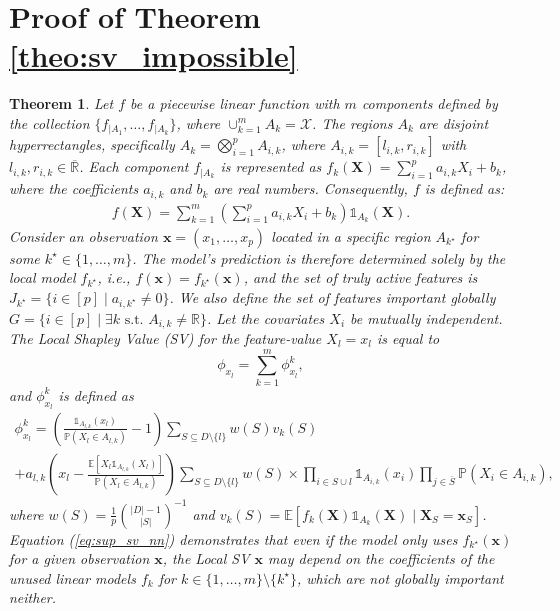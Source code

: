 \documentclass{article}
\newcommand\XS{\boldsymbol{X}_S}
\newcommand\X{\boldsymbol{X}}
\newcommand\xs{\boldsymbol{x}_S}
\newcommand\x{\boldsymbol{x}}
\theoremstyle{plain}
\newtheorem{theorem}{Theorem}[section]
\theoremstyle{definition}
\theoremstyle{remark}
\begin{document}
\section{Proof of Theorem \ref{theo:sv_impossible}} \label{sup:proof_shapdecomposition}
\begin{theorem}
    Let $f$ be a piecewise linear function with $m$ components defined by the collection $\{f_{\lvert A_1}, \dots, f_{\lvert A_k}\}$, where $\cup_{k=1}^m A_k = \mathcal{X}$. The regions $A_k$ are disjoint hyperrectangles, specifically $A_k = \bigotimes_{i = 1}^{p} A_{i,k}$, where $A_{i, k} = [l_{i, k}, r_{i, k}]$ with $l_{i, k}, r_{i, k} \in \overline{\mathbb{R}}$. Each component $f_{\lvert A_k}$ is represented as $f_k(\X) = \sum_{i=1}^p a_{i, k} X_i + b_k$, where the coefficients $a_{i,k}$ and $b_k$ are real numbers. Consequently, $f$ is defined as:
    \begin{align*}
        f(\X) =  \sum_{k=1}^m \left(\sum_{i=1}^p a_{i, k} X_i + b_k \right)\mathds{1}_{A_k}(\X).
    \end{align*}
    Consider an observation $\mathbf{x} = (x_1, \dots, x_p)$ located in a specific region $A_{k^\star}$ for some $k^\star \in \{1, \dots, m\}$. The model's prediction is therefore determined solely by the local model $f_{k^\star}$, i.e., $f(\mathbf{x}) = f_{k^\star}(\mathbf{x})$, and the set of truly active features is $J_{k^\star} = \{i \in [p] \mid a_{i,k^\star} \neq 0\}$. We also define the set of features important globally $G = \{i \in [p] \mid \exists k \text{ s.t. } A_{i,k} \neq \mathbb{R}\}$. Let the covariates $X_i$ be mutually independent. The Local Shapley Value (SV) for the feature-value $X_l=x_l$ is equal to
    \begin{equation*}
        \phi_{x_l} = \sum_{k=1}^m \phi_{x_l}^k,
    \end{equation*}
    and $\phi_{x_l}^k$ is defined as 
    \begin{multline} \label{eq:sup_sv_nn}
        \phi_{x_l}^k = \left(\frac{\mathds{1}_{A_{l, k}}(x_l)}{\mathbb{P}(X_l \in A_{l, k})} - 1 \right)  \sum_{S \subseteq D\setminus\{l\}} w(S) v_k(S) \\
         + a_{l, k} \left( x_{l} - \frac{\mathbb{E}\left[ X_l \mathds{1}_{A_{l, k}}(X_l)\right]}{\mathbb{P}(X_l \in A_{l, k})}\right) \sum_{S \subseteq D\setminus\{l\}} w(S) \times \prod_{i \in S\cup l} \mathds{1}_{A_{i, k}}(x_i) \prod_{j \in \overline{S}}\mathbb{P}(X_i \in A_{i, k}), 
    \end{multline}
    where $w(S)= \frac{1}{p} \binom{|D|-1}{|S|}^{-1}$ and $v_k(S) = \mathbb{E}[f_k(\X)\mathds{1}_{A_k}(\X) \; | \; \XS = \xs]$. Equation (\ref{eq:sup_sv_nn}) demonstrates that even if the model only uses  $f_{k^\star}(\x)$ for a given observation $\x$, the Local SV $\x$ may depend on the coefficients of the unused linear models $f_k$ for $k \in \{1, \dots, m\}\setminus \{k^\star\}$, which are not globally important neither.

\end{theorem}
\end{document}
